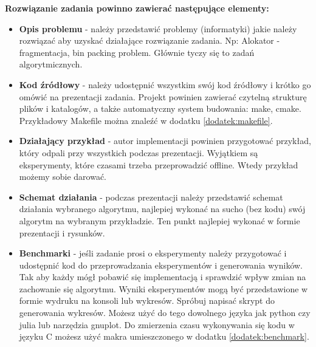 \textbf{Rozwiązanie zadania powinno zawierać następujące elementy:}
\begin{itemize}
    \item \textbf{Opis problemu} - należy przedstawić problemy (informatyki) jakie należy rozwiązać aby uzyskać działające rozwiązanie zadania. Np: Alokator - fragmentacja, bin packing problem. Głównie tyczy się to zadań algorytmicznych.
    \item \textbf{Kod źródłowy} - należy udostępnić wszystkim swój kod źródłowy i krótko go omówić na prezentacji zadania. Projekt powinien zawierać czytelną strukturę plików i katalogów, a także automatyczny system budowania: make, cmake.
    Przykładowy Makefile można znaleźć w dodatku \ref{dodatek:makefile}.
    \item \textbf{Działający przykład} - autor implementacji powinien przygotować przykład, który odpali przy wszystkich podczas prezentacji. Wyjątkiem są eksperymenty, które czasami trzeba przeprowadzić offline. Wtedy przykład możemy sobie darować.
    \item \textbf{Schemat działania} - podczas prezentacji należy przedstawić schemat działania wybranego algorytmu, najlepiej wykonać na sucho (bez kodu) swój algorytm na wybranym przykładzie. Ten punkt najlepiej wykonać w formie prezentacji i rysunków.
    \item \textbf{Benchmarki} - jeśli zadanie prosi o eksperymenty należy przygotować i udostępnić kod do przeprowadzania eksperymentów i generowania wyników. Tak aby każdy mógł pobawić się implementacją i sprawdzić wpływ zmian na zachowanie się algorytmu. Wyniki eksperymentów mogą być przedstawione w formie wydruku na konsoli lub wykresów. Spróbuj napisać skrypt do generowania wykresów. Możesz użyć do tego dowolnego języka jak python czy julia lub narzędzia gnuplot.
    Do zmierzenia czasu wykonywania się kodu w języku C możesz użyć makra umieszczonego w dodatku \ref{dodatek:benchmark}.
\end{itemize}
